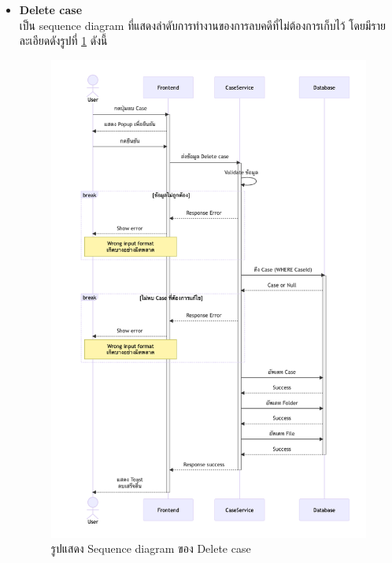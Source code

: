 \documentclass[12pt,oneside,openright,a4paper]{cpe-thai-project}
\begin{document}
\begin{itemize}
    \newpage
    \item \textbf{Delete case} \\
    เป็น sequence diagram ที่แสดงลำดับการทำงานของการลบคดีที่ไม่ต้องการเก็บไว้ โดยมีรายละเอียดดังรูปที่ \ref{fig:sqDeleteCase} ดังนี้ 
    \begin{figure}[!ht]\centering
        \includegraphics[width=14.5cm, trim={1.5cm 1cm 1 1cm},clip]{./assets/sequence-diagram/delete-case.png}
        \caption{รูปแสดง Sequence diagram ของ Delete case}\label{fig:sqDeleteCase}
    \end{figure}


\end{itemize}
\end{document}
